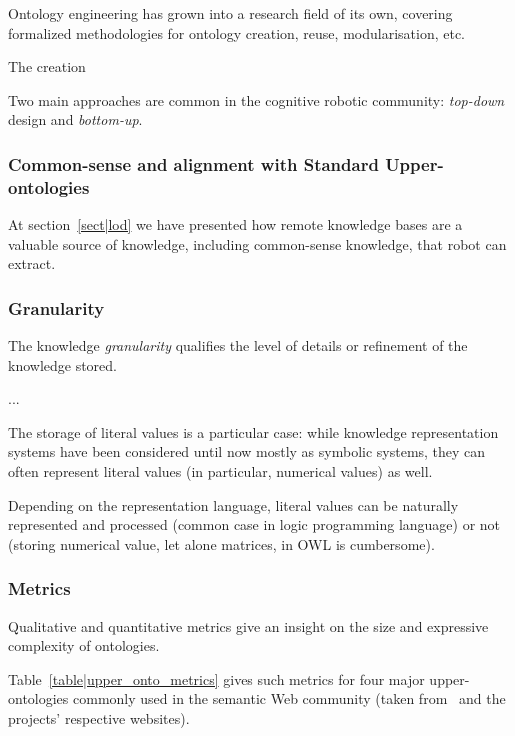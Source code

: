 \documentclass[a4paper, twocolumn]{article}
\begin{document}
Ontology engineering has grown into a research field of its own, covering
formalized methodologies for ontology creation, reuse, modularisation, etc.

The creation

Two main approaches are common in the cognitive robotic community:
\emph{top-down} design and \emph{bottom-up}.

\subsubsection{Common-sense and alignment with Standard Upper-ontologies}

At section~\ref{sect|lod} we have presented how remote knowledge bases are a
valuable source of knowledge, including common-sense knowledge, that robot can
extract.

\subsubsection{Granularity}

The knowledge \emph{granularity} qualifies the level of details or refinement
of the knowledge stored.

...

The storage of literal values is a particular case: while knowledge
representation systems have been considered until now mostly as symbolic
systems, they can often represent literal values (in particular, numerical
values) as well.

Depending on the representation language, literal values can be naturally
represented and processed (common case in logic programming language) or not
(storing numerical value, let alone matrices, in OWL is cumbersome).

\subsubsection{Metrics}

Qualitative and quantitative metrics give an insight on the size and
expressive complexity of ontologies.

Table~\ref{table|upper_onto_metrics} gives such metrics for four major
upper-ontologies commonly used in the semantic Web community (taken
from~\cite{Mascardi2007} and the projects' respective websites).
\end{document}
